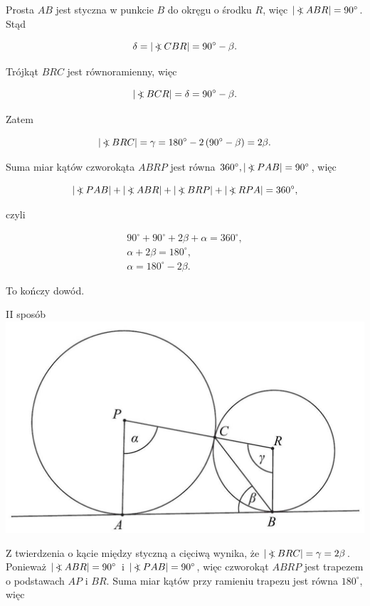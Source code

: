 \documentclass[10pt]{article}
\newcommand\Varangle{\mathop{{<\!\!\!\!\!\text{\small)}}\:}\nolimits}
\begin{document}
Prosta $A B$ jest styczna w punkcie $B$ do okręgu o środku $R$, więc $|\Varangle A B R|=90^{\circ}$. Stąd

$$
\delta=|\Varangle C B R|=90^{\circ}-\beta .
$$

Trójkąt $B R C$ jest równoramienny, więc

$$
|\Varangle B C R|=\delta=90^{\circ}-\beta .
$$

Zatem

$$
|\Varangle B R C|=\gamma=180^{\circ}-2\left(90^{\circ}-\beta\right)=2 \beta .
$$

Suma miar kątów czworokąta $A B R P$ jest równa $360^{\circ},|\Varangle P A B|=90^{\circ}$, więc

$$
|\Varangle P A B|+|\Varangle A B R|+|\Varangle B R P|+|\Varangle R P A|=360^{\circ},
$$

czyli

$$
\begin{gathered}
90^{\circ}+90^{\circ}+2 \beta+\alpha=360^{\circ}, \\
\alpha+2 \beta=180^{\circ}, \\
\alpha=180^{\circ}-2 \beta .
\end{gathered}
$$

To kończy dowód.

II sposób\\
\includegraphics[max width=\textwidth, center]{2025_02_07_e35f706dbfcfb4be75cfg-09}

Z twierdzenia o kącie między styczną a cięciwą wynika, że $|\Varangle B R C|=\gamma=2 \beta$.\\
Ponieważ $|\Varangle A B R|=90^{\circ}$ i $|\Varangle P A B|=90^{\circ}$, więc czworokąt $A B R P$ jest trapezem o podstawach $A P$ i $B R$. Suma miar kątów przy ramieniu trapezu jest równa $180^{\circ}$, więc
\end{document}
